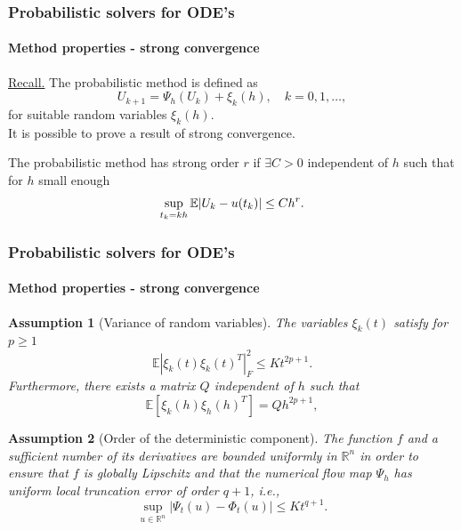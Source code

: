 \documentclass{beamer}
\newcommand{\R}{\mathbb{R}}
\newcommand{\E}{\mathbb{E}}
\newtheorem{assumption}{Assumption}
\begin{document}

\begin{frame}
	\frametitle{Probabilistic solvers for ODE's}
	\framesubtitle{Method properties - strong convergence \cite{CGS16}}
	
	\underline{Recall.} The probabilistic method is defined as
	\begin{equation*}
		U_{k+1} = \Psi_h(U_k) + \xi_k(h), \quad k = 0, 1, \ldots,
	\end{equation*}
	for suitable random variables $\xi_k(h)$. \\[0.5cm]
	
	It is possible to prove a result of strong convergence.
	
	\begin{definition} The probabilistic method has strong order $r$ if $\exists C > 0$ independent of $h$ such that for $h$ small enough
		\begin{equation*}
			\sup_{t_k = kh} \E\abs{U_k - u(t_k)} \leq Ch^r.
		\end{equation*}
	\end{definition}
	
\end{frame}
	
\begin{frame}
	\frametitle{Probabilistic solvers for ODE's}
	\framesubtitle{Method properties - strong convergence \cite{CGS16}}
	
	\begin{assumption}[Variance of random variables] The variables $\xi_k(t)$ satisfy for $p \geq 1$
		\begin{equation*}
			\E|\xi_k(t)\xi_k(t)^T|^2_F \leq Kt^{2p+1}.
		\end{equation*}
		Furthermore, there exists a matrix $Q$ independent of $h$ such that 
		\begin{equation*}
		\E[\xi_k(h)\xi_h(h)^T] = Qh^{2p+1},
		\end{equation*}
	\end{assumption}
		
	\begin{assumption}[Order of the deterministic component] The function $f$ and a sufficient number of its derivatives are bounded uniformly in $\R^n$ in order to ensure that $f$ is globally Lipschitz and that the numerical flow map $\Psi_h$ has uniform local truncation error of order $q + 1$, i.e., 
		\begin{equation*}
			\sup_{u\in\R^n} |\Psi_t(u) - \Phi_t(u)| \leq Kt^{q+1}.
		\end{equation*}
	\end{assumption}	
\end{frame}
\end{document}
